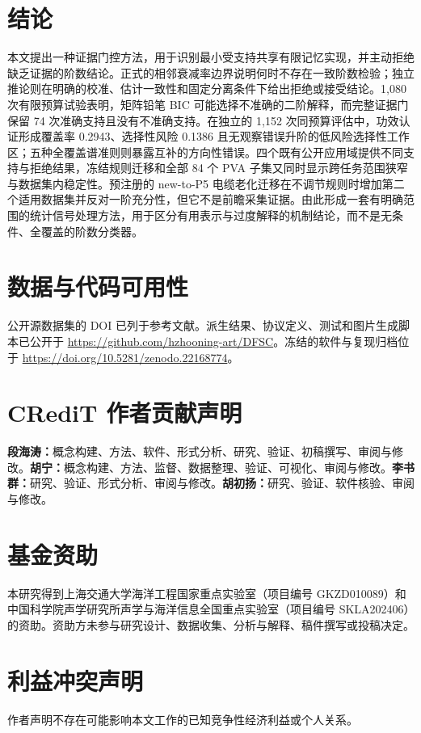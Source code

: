 \documentclass[UTF8,11pt]{ctexart}
\begin{document}
\section{结论}
本文提出一种证据门控方法，用于识别最小受支持共享有限记忆实现，并主动拒绝缺乏证据的阶数结论。正式的相邻衰减率边界说明何时不存在一致阶数检验；独立推论则在明确的校准、估计一致性和固定分离条件下给出拒绝或接受结论。1,080 次有限预算试验表明，矩阵铅笔 BIC 可能选择不准确的二阶解释，而完整证据门保留 74 次准确支持且没有不准确支持。在独立的 1,152 次同预算评估中，功效认证形成覆盖率 0.2943、选择性风险 0.1386 且无观察错误升阶的低风险选择性工作区；五种全覆盖谱准则则暴露互补的方向性错误。四个既有公开应用域提供不同支持与拒绝结果，冻结规则迁移和全部 84 个 PVA 子集又同时显示跨任务范围狭窄与数据集内稳定性。预注册的 new-to-P5 电缆老化迁移在不调节规则时增加第二个适用数据集并反对一阶充分性，但它不是前瞻采集证据。由此形成一套有明确范围的统计信号处理方法，用于区分有用表示与过度解释的机制结论，而不是无条件、全覆盖的阶数分类器。

\section*{数据与代码可用性}
公开源数据集的 DOI 已列于参考文献。派生结果、协议定义、测试和图片生成脚本已公开于 \url{https://github.com/hzhooning-art/DFSC}。冻结的软件与复现归档位于 \url{https://doi.org/10.5281/zenodo.22168774}。

\section*{CRediT 作者贡献声明}
\textbf{段海涛：}概念构建、方法、软件、形式分析、研究、验证、初稿撰写、审阅与修改。\textbf{胡宁：}概念构建、方法、监督、数据整理、验证、可视化、审阅与修改。\textbf{李书群：}研究、验证、形式分析、审阅与修改。\textbf{胡初扬：}研究、验证、软件核验、审阅与修改。

\section*{基金资助}
本研究得到上海交通大学海洋工程国家重点实验室（项目编号 GKZD010089）和中国科学院声学研究所声学与海洋信息全国重点实验室（项目编号 SKLA202406）的资助。资助方未参与研究设计、数据收集、分析与解释、稿件撰写或投稿决定。

\section*{利益冲突声明}
作者声明不存在可能影响本文工作的已知竞争性经济利益或个人关系。
\end{document}

